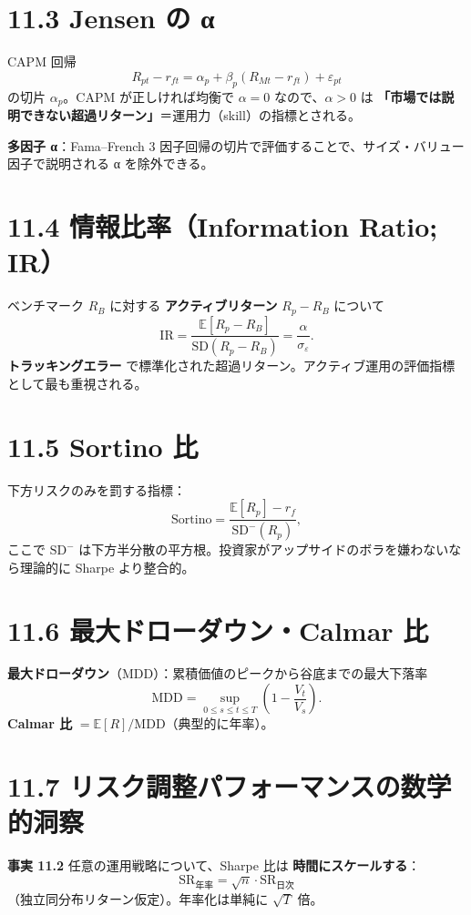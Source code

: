 \documentclass[11pt,a4paper]{report}
\begin{document}
\section{11.3 Jensen の α}

CAPM 回帰 \[ R_{pt} - r_{ft} = \alpha_p + \beta_p (R_{Mt} - r_{ft}) + \varepsilon_{pt} \] の切片 $\alpha_p$。CAPM が正しければ均衡で $\alpha = 0$ なので、$\alpha > 0$ は \textbf{「市場では説明できない超過リターン」}＝運用力（skill）の指標とされる。

\textbf{多因子 α}：Fama–French 3 因子回帰の切片で評価することで、サイズ・バリュー因子で説明される α を除外できる。

\section{11.4 情報比率（Information Ratio; IR）}

ベンチマーク $R_B$ に対する \textbf{アクティブリターン} $R_p - R_B$ について \[ \mathrm{IR} = \frac{\mathbb{E}[R_p - R_B]}{\mathrm{SD}(R_p - R_B)} = \frac{\alpha}{\sigma_\varepsilon}. \] \textbf{トラッキングエラー} で標準化された超過リターン。アクティブ運用の評価指標として最も重視される。

\section{11.5 Sortino 比}

下方リスクのみを罰する指標： \[ \mathrm{Sortino} = \frac{\mathbb{E}[R_p] - r_f}{\mathrm{SD}^-(R_p)}, \] ここで $\mathrm{SD}^-$ は下方半分散の平方根。投資家がアップサイドのボラを嫌わないなら理論的に Sharpe より整合的。

\section{11.6 最大ドローダウン・Calmar 比}

\textbf{最大ドローダウン}（MDD）：累積価値のピークから谷底までの最大下落率 \[ \mathrm{MDD} = \sup_{0 \le s \le t \le T} \left(1 - \frac{V_t}{V_s}\right). \] \textbf{Calmar 比} $= \mathbb{E}[R] / \mathrm{MDD}$（典型的に年率）。

\section{11.7 リスク調整パフォーマンスの数学的洞察}

\textbf{事実 11.2} 任意の運用戦略について、Sharpe 比は \textbf{時間にスケールする}： \[ \mathrm{SR}_{\text{年率}} = \sqrt{n} \cdot \mathrm{SR}_{\text{日次}} \] （独立同分布リターン仮定）。年率化は単純に $\sqrt{T}$ 倍。
\end{document}
